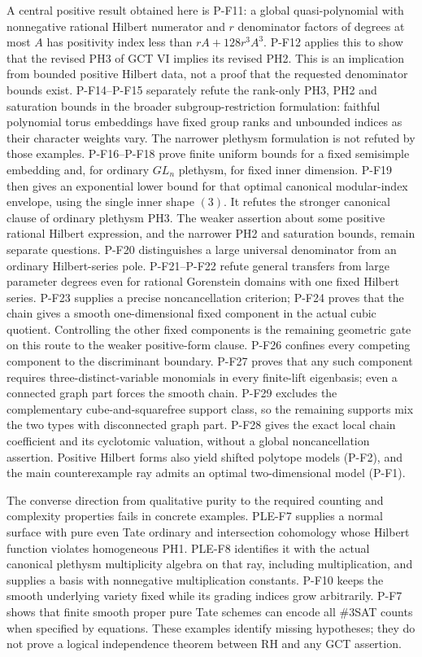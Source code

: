 \documentclass[11pt,a4paper]{article}
\begin{document}
A central positive result obtained here is P-F11: a global
quasi-polynomial with nonnegative rational Hilbert numerator and
$r$ denominator factors of degrees at most $A$ has positivity index
less than $rA+128r^3A^3$. P-F12 applies this to show that the revised
PH3 of GCT VI implies its revised PH2. This is an implication from
bounded positive Hilbert data, not a proof that the requested
denominator bounds exist.
P-F14--P-F15 separately refute the rank-only PH3, PH2 and saturation
bounds in the broader subgroup-restriction formulation: faithful
polynomial torus embeddings have fixed group ranks and unbounded
indices as their character weights vary. The narrower plethysm
formulation is not refuted by those examples.
P-F16--P-F18 prove finite uniform bounds for a fixed semisimple
embedding and, for ordinary $GL_n$ plethysm, for fixed inner dimension.
P-F19 then gives an exponential lower bound for that optimal canonical
modular-index envelope, using the single inner shape $(3)$.
It refutes the stronger canonical clause of ordinary plethysm PH3.
The weaker assertion about some positive rational Hilbert expression,
and the narrower PH2 and saturation bounds, remain separate questions.
P-F20 distinguishes a large universal denominator from an ordinary
Hilbert-series pole. P-F21--P-F22 refute general transfers from large
parameter degrees even for rational Gorenstein domains with one fixed
Hilbert series. P-F23 supplies a precise noncancellation criterion;
P-F24 proves that the chain gives a smooth one-dimensional fixed
component in the actual cubic quotient. Controlling the other fixed
components is the remaining geometric gate on this route to the
weaker positive-form clause. P-F26 confines every competing component
to the discriminant boundary. P-F27 proves that any such component
requires three-distinct-variable monomials in every finite-lift
eigenbasis; even a connected graph part forces the smooth chain.
P-F29 excludes the complementary cube-and-squarefree support class,
so the remaining supports mix the two types with disconnected
graph part. P-F28 gives the exact local chain coefficient and its
cyclotomic valuation, without a global noncancellation assertion.
Positive Hilbert forms also yield
shifted polytope models (P-F2), and the main counterexample ray admits
an optimal two-dimensional model (P-F1).

The converse direction from qualitative purity to the required counting
and complexity properties fails in concrete examples. PLE-F7 supplies a
normal surface with pure even Tate ordinary and intersection cohomology
whose Hilbert function violates homogeneous PH1. PLE-F8 identifies it
with the actual canonical plethysm multiplicity algebra on that ray,
including multiplication, and supplies a basis with nonnegative
multiplication constants. P-F10 keeps the smooth
underlying variety fixed while its grading indices grow arbitrarily.
P-F7 shows that finite smooth proper pure Tate schemes can encode all
\#3SAT counts when specified by equations. These examples identify
missing hypotheses; they do not prove a logical independence theorem
between RH and any GCT assertion.
\end{document}
